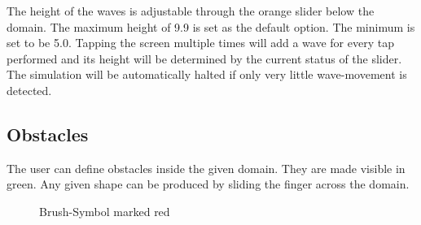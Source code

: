 \documentclass[11pt,a4paper]{article}
\begin{document}
The height of the waves is adjustable through the orange slider below the domain. The maximum height of 9.9 is set as the default option. The minimum is set to be 5.0. Tapping the screen multiple times will add a wave for every tap performed and its height will be determined by the current status of the slider. The simulation will be automatically halted if only very little wave-movement is detected.

\subsection{Obstacles}
The user can define obstacles inside the given domain. They are made visible in green. Any given shape can be produced by sliding the finger across the domain.


\begin{figure}[h]
\caption{Brush-Symbol marked red}
\end{figure}
\end{document}
